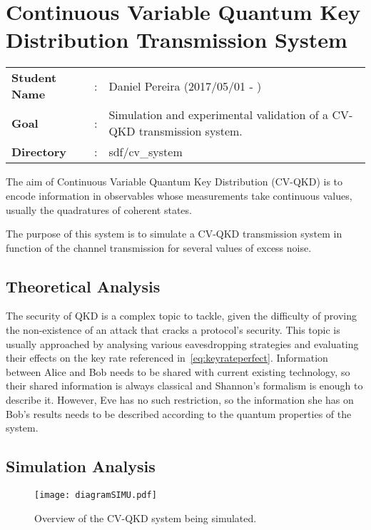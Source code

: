 \clearpage
\section{Continuous Variable Quantum Key Distribution Transmission System}\label{sec:intro}

\begin{tcolorbox}	
\begin{tabular}{p{2.75cm} p{0.2cm} p{10.5cm}} 	
\textbf{Student Name}  &:& Daniel Pereira (2017/05/01 - )\\
\textbf{Goal}          &:& Simulation and experimental validation of a CV-QKD transmission system.\\
\textbf{Directory}              &:& sdf/cv\_system  
\end{tabular}
\end{tcolorbox}

The aim of Continuous Variable Quantum Key Distribution (CV-QKD) is to encode information in observables whose measurements take continuous values, usually the quadratures of coherent states.
\par
The purpose of this system is to simulate a CV-QKD transmission system in function of the channel transmission for several values of excess noise.

\subsection{Theoretical Analysis}

The security of QKD is a complex topic to tackle, given the difficulty of proving the non-existence of an attack that cracks a protocol's security. This topic is usually approached by analysing various eavesdropping strategies and evaluating their effects on the key rate referenced in~\eqref{eq:keyrateperfect}. Information between Alice and Bob needs to be shared with current existing technology, so their shared information is always classical and Shannon's formalism is enough to describe it. However, Eve has no such restriction, so the information she has on Bob's results needs to be described according to the quantum properties of the system. 

\subsection{Simulation Analysis}

\begin{figure}[h]
\centering
\texttt{[image: diagramSIMU.pdf]}
\caption{Overview of the CV-QKD system being simulated.}
\label{fig:CV-System}
\end{figure}


